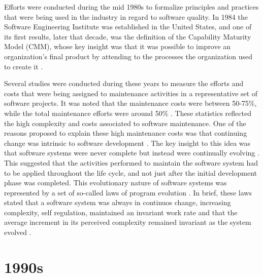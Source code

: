 \documentclass[10pt]{article}
\begin{document}
Efforts were conducted during the mid 1980s to formalize principles and practices that were being used in the industry in regard to software quality. In 1984 the Software Engineering Institute was established in the United States, and one of its first results, later that decade, was the definition of the Capability Maturity Model (CMM), whose key insight was that it was possible to improve an organization’s final product by attending to the processes the organization used to create it \cite{Naik08}.

Several studies were conducted during these years to measure the efforts and costs that were being assigned to maintenance activities in a representative set of software projects. It was noted that the maintenance costs were between 50-75\%, while the total maintenance efforts were around 50\% \cite{Boehm81} \cite{Lientz81}. These statistics reflected the high complexity and costs associated to software maintenance. One of the reasons proposed to explain these high maintenance costs was that continuing change was intrinsic to software development \cite{Lehman80}. The key insight to this idea was that software systems were never complete but instead were continually evolving \cite{Lehman80}. This suggested that the activities performed to maintain the software system had to be applied throughout the life cycle, and not just after the initial development phase was completed. This evolutionary nature of software systems was represented by a set of so-called laws of program evolution \cite{Lehman80}. In brief, these laws stated that a software system was always in continuos change, increasing complexity, self regulation, maintained an invariant work rate and that the average increment in its perceived complexity remained invariant as the system evolved \cite{Lehman80}.


\section{1990s}
\end{document}

